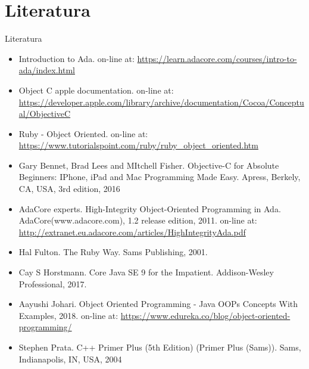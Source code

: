 \documentclass[14pt,aspectratio=169]{beamer}
\begin{document}
\section{Literatura}
\begin{frame}[fragile]{Literatura}
\begin{itemize}
	\scriptsize
	\item Introduction to Ada. on-line at: \url{https://learn.adacore.com/courses/intro-to-ada/index.html}
	\item Object C apple documentation. on-line at: \url{https://developer.apple.com/library/archive/documentation/Cocoa/Conceptual/ObjectiveC}
	\item Ruby - Object Oriented. on-line at: \url{https://www.tutorialspoint.com/ruby/ruby_object_oriented.htm}
	\item Gary Bennet, Brad Lees and MItchell Fisher. Objective-C for Absolute Beginners: IPhone, iPad and Mac Programming Made Easy. Apress, Berkely, CA, USA, 3rd edition, 2016
	\item AdaCore experts. High-Integrity Object-Oriented Programming in Ada. AdaCore(www.adacore.com), 1.2 release edition, 2011. on-line at: \url{http://extranet.eu.adacore.com/articles/HighIntegrityAda.pdf}
	\item Hal Fulton. The Ruby Way. Sams Publishing, 2001.
	\item Cay S Horstmann. Core Java SE 9 for the Impatient. Addison-Wesley Professional, 2017.
	\item Aayushi Johari. Object Oriented Programming - Java OOPs Concepts With Examples, 2018. on-line at: \url{https://www.edureka.co/blog/object-oriented-programming/}
	\item Stephen Prata. C++ Primer Plus (5th Edition) (Primer Plus (Sams)). Sams, Indianapolis, IN, USA, 2004
\end{itemize}

\end{frame}
\end{document}

